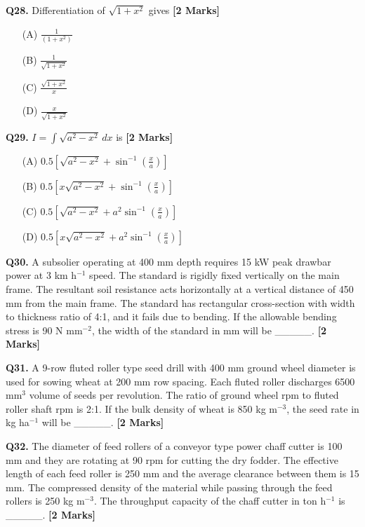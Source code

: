 \documentclass[11pt]{article}
\newcommand{\questionb}[2]{
    \noindent\textbf{Q#2.} #1 \hfill \textbf{[2 Marks]}
}
\begin{document}
\questionb{Differentiation of $\sqrt{1 + x^2}$ gives}{28}
\begin{enumerate}
    \item[(A)] $\frac{1}{(1 + x^2)}$
    \item[(B)] $\frac{1}{\sqrt{1 + x^2}}$
    \item[(C)] $\frac{\sqrt{1 + x^2}}{x}$
    \item[(D)] $\frac{x}{\sqrt{1 + x^2}}$
\end{enumerate}

\vspace{0.5cm}

\questionb{$I = \int \sqrt{a^2 - x^2} \, dx$ is}{29}
\begin{enumerate}
    \item[(A)] $0.5 \left[ \sqrt{a^2 - x^2} + \sin^{-1}\left(\frac{x}{a}\right) \right]$
    \item[(B)] $0.5 \left[ x\sqrt{a^2 - x^2} + \sin^{-1}\left(\frac{x}{a}\right) \right]$
    \item[(C)] $0.5 \left[ \sqrt{a^2 - x^2} + a^2 \sin^{-1}\left(\frac{x}{a}\right) \right]$
    \item[(D)] $0.5 \left[ x\sqrt{a^2 - x^2} + a^2 \sin^{-1}\left(\frac{x}{a}\right) \right]$
\end{enumerate}

\vspace{0.5cm}

\questionb{A subsolier operating at 400 mm depth requires 15 kW peak drawbar power at 3 km h$^{-1}$ speed. The standard is rigidly fixed vertically on the main frame. The resultant soil resistance acts horizontally at a vertical distance of 450 mm from the main frame. The standard has rectangular cross-section with width to thickness ratio of 4:1, and it fails due to bending. If the allowable bending stress is 90 N mm$^{-2}$, the width of the standard in mm will be \_\_\_\_\_.}{30}

\vspace{0.5cm}

\questionb{A 9-row fluted roller type seed drill with 400 mm ground wheel diameter is used for sowing wheat at 200 mm row spacing. Each fluted roller discharges 6500 mm$^3$ volume of seeds per revolution. The ratio of ground wheel rpm to fluted roller shaft rpm is 2:1. If the bulk density of wheat is 850 kg m$^{-3}$, the seed rate in kg ha$^{-1}$ will be \_\_\_\_\_.}{31}

\vspace{0.5cm}

\questionb{The diameter of feed rollers of a conveyor type power chaff cutter is 100 mm and they are rotating at 90 rpm for cutting the dry fodder. The effective length of each feed roller is 250 mm and the average clearance between them is 15 mm. The compressed density of the material while passing through the feed rollers is 250 kg m$^{-3}$. The throughput capacity of the chaff cutter in ton h$^{-1}$ is \_\_\_\_\_.}{32}
\end{document}
